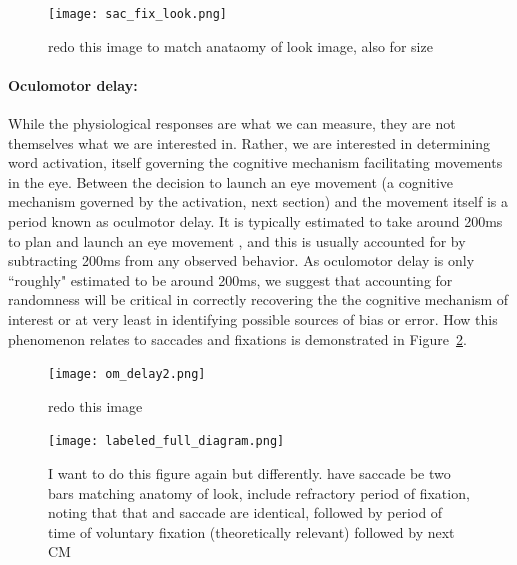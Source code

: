 \begin{figure}[H]
\centering
\texttt{[image: sac\_fix\_look.png]}
\caption{redo this image to match anataomy of look image, also for size}
\label{fig:sac_fix_look}
\end{figure}

\paragraph{Oculomotor delay:} While the physiological responses are what we can measure, they are not themselves what we are interested in. Rather, we are interested in determining word activation, itself governing the cognitive mechanism facilitating movements in the eye. Between the decision to launch an eye movement (a cognitive mechanism governed by the activation, next section) and the movement itself is a period known as oculmotor delay. It is typically estimated to take around 200ms to plan and launch an eye movement \cite{viviani1990time}, and this is usually accounted for by subtracting 200ms from any observed behavior. As oculomotor delay is only ``roughly" estimated to be around 200ms, we suggest that accounting for randomness will be critical in correctly recovering the the cognitive mechanism of interest or at very least in identifying possible sources of bias or error. How this phenomenon relates to saccades and fixations is demonstrated in Figure~\ref{fig:sac_fix_look_om}.


\begin{figure}[H]
\centering
\texttt{[image: om\_delay2.png]}
\caption{redo this image}
\label{fig:sac_fix_look_om}
\end{figure}


\begin{figure}
\centering
\texttt{[image: labeled\_full\_diagram.png]}
\caption{I want to do this figure again but differently. have saccade be  two bars matching anatomy of look, include refractory period of fixation, noting that that and saccade are identical, followed by period of time of voluntary fixation (theoretically relevant) followed by next CM}
\label{fig:full_diagram_looks}
\end{figure}

